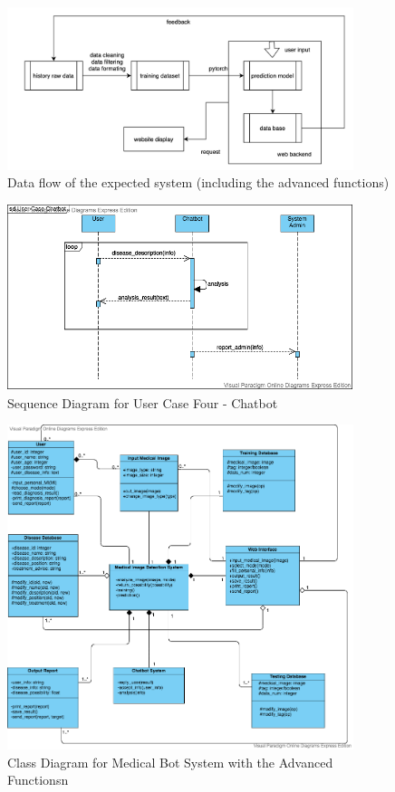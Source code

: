 \documentclass[11pt,bibliography=totocnumbered]{article}
\begin{document}
   \begin{figure}[H]
  	\centering
  	\includegraphics[width=0.9\textwidth]{figures/flow}
  	\caption{Data flow of the expected system (including the advanced functions)}
  	\label{fig:flow}
  \end{figure}
  
  \begin{figure}[H]
  	\centering
  	\includegraphics[width=0.9\textwidth]{figures/chatbot}
  	\caption{Sequence Diagram for User Case Four - Chatbot}
  	\label{fig:chatbot}
  \end{figure}

	\begin{figure}[H]
		\centering
		\includegraphics[width=0.9\textwidth]{figures/class-with-chatbot}
		\caption{Class Diagram for Medical Bot System with the Advanced Functionsn}
		\label{fig:class-with-chatbot}
	\end{figure}
  
\end{document}
